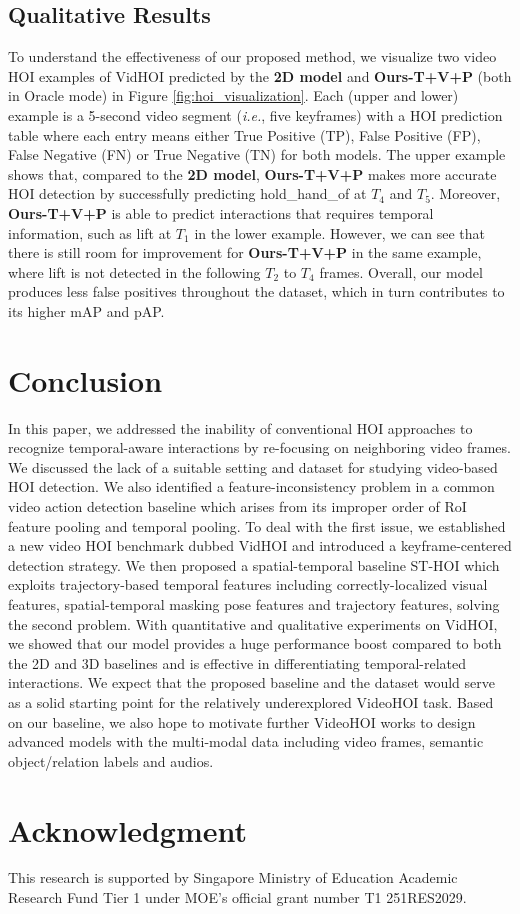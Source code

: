 \documentclass[sigconf]{acmart}
\begin{document}
\subsection{Qualitative Results}
\label{subsec:qualitative}

To understand the effectiveness of our proposed method, we visualize two video HOI examples of VidHOI predicted by the \textbf{2D model} \cite{wan2019pose} and \textbf{Ours-T+V+P} (both in {\selectfont Oracle} mode) in Figure \ref{fig:hoi_visualization}.
Each (upper and lower) example is a 5-second video segment (\emph{i.e.}, five keyframes) with a HOI prediction table where each entry means either True Positive (TP), False Positive (FP), False Negative (FN) or True Negative (TN) for both models.
The upper example shows that, compared to the \textbf{2D model}, \textbf{Ours-T+V+P} makes more accurate HOI detection by successfully predicting {\selectfont hold\_hand\_of} at $T_4$ and $T_5$.
Moreover, \textbf{Ours-T+V+P} is able to predict interactions that requires temporal information, such as {\selectfont lift} at $T_1$ in the lower example.
However, we can see that there is still room for improvement for \textbf{Ours-T+V+P} in the same example, where {\selectfont lift} is not detected in the following $T_2$ to $T_4$ frames.
Overall, our model produces less false positives throughout the dataset, which in turn contributes to its higher mAP and pAP.

\section{Conclusion}
\label{sec:conclusion}

In this paper, we addressed the inability of conventional HOI approaches to recognize temporal-aware interactions by re-focusing on neighboring video frames.
We discussed the lack of a suitable setting and dataset for studying video-based HOI detection.
We also identified a feature-inconsistency problem in a common video action detection baseline which arises from its improper order of RoI feature pooling and temporal pooling.
To deal with the first issue, we established a new video HOI benchmark dubbed VidHOI and introduced a keyframe-centered detection strategy.
We then proposed a spatial-temporal baseline ST-HOI which exploits trajectory-based temporal features including correctly-localized visual features, spatial-temporal masking pose features and trajectory features, solving the second problem.
With quantitative and qualitative experiments on VidHOI, we showed that our model provides a huge performance boost compared to both the 2D and 3D baselines and is effective in differentiating temporal-related interactions.
We expect that the proposed baseline and the dataset would serve as a solid starting point for the relatively underexplored VideoHOI task.
Based on our baseline, we also hope to motivate further VideoHOI works to design advanced models with the multi-modal data including video frames, semantic object/relation labels and audios.

\section*{Acknowledgment}
This research is supported by Singapore Ministry of Education Academic Research Fund Tier 1 under MOE's official grant number T1 251RES2029.



\end{document}
